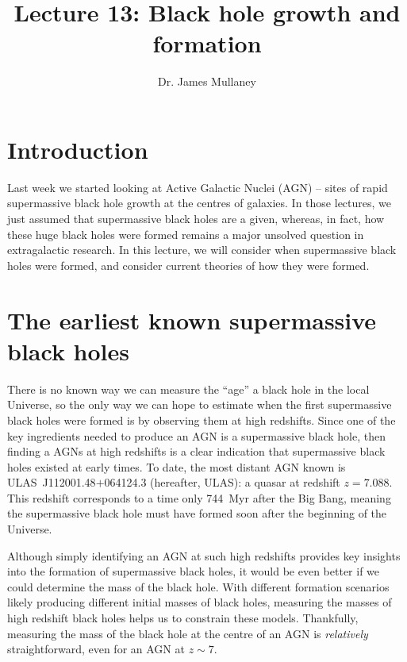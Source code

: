 \documentclass[11pt]{article}
\begin{document}
 
\title{Lecture 13: Black hole growth and formation}
\author{Dr. James Mullaney}
\maketitle

\section{Introduction}
Last week we started looking at Active Galactic Nuclei (AGN) -- sites of
rapid supermassive black hole growth at the centres of galaxies. In
those lectures, we just assumed that supermassive black holes are a
given, whereas, in fact, how these huge black holes were formed
remains a major unsolved question in extragalactic research. In this
lecture, we will consider when supermassive black holes were formed,
and consider current theories of how they were formed.

\section{The earliest known supermassive black holes}
There is no known way we can measure the ``age'' a black hole in the local
Universe, so the only way we can hope to estimate when the first
supermassive black holes were formed is by observing them at high
redshifts. Since one of the key ingredients needed to produce an AGN
is a supermassive black hole, then finding a AGNs at high redshifts is
a clear indication that supermassive black holes existed at early
times. To date, the most distant AGN known is
ULAS~J112001.48$+$064124.3 (hereafter, ULAS): a quasar at redshift
$z=7.088$. This redshift corresponds to a time only 744~Myr after the
Big Bang, meaning the supermassive black hole must have formed soon
after the beginning of the Universe.

Although simply identifying an AGN at such high redshifts provides key
insights into the formation of supermassive black holes, it would be
even better if we could determine the mass of the black hole. With
different formation scenarios likely producing different initial
masses of black holes, measuring the masses of high redshift black
holes helps us to constrain these models. Thankfully, measuring the
mass of the black hole at the centre of an AGN is {\it relatively}
straightforward, even for an AGN at $z\sim7$.
 
\end{document}
